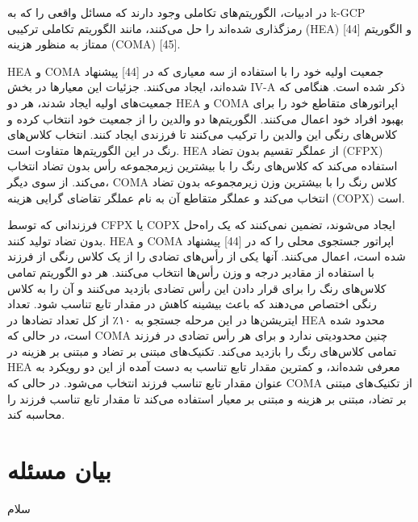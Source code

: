 \documentclass[a4paper,10pt]{article}
\begin{document}
        در ادبیات، الگوریتم‌های تکاملی وجود دارند که مسائل واقعی را که به k-GCP رمزگذاری شده‌اند را حل می‌کنند، مانند الگوریتم تکاملی ترکیبی (HEA) [44] و الگوریتم ممتاز به منظور هزینه (COMA) [45].

        HEA و COMA جمعیت اولیه خود را با استفاده از سه معیاری که در [44] پیشنهاد شده‌اند، ایجاد می‌کنند. جزئیات این معیارها در بخش IV-A ذکر شده است. هنگامی که جمعیت‌های اولیه ایجاد شدند، هر دو HEA و COMA اپراتورهای متقاطع خود را برای بهبود افراد خود اعمال می‌کنند. الگوریتم‌ها دو والدین را از جمعیت خود انتخاب کرده و کلاس‌های رنگی این والدین را ترکیب می‌کنند تا فرزندی ایجاد کنند. انتخاب کلاس‌های رنگ در این الگوریتم‌ها متفاوت است. HEA از عملگر تقسیم بدون تضاد (CFPX) استفاده می‌کند که کلاس‌های رنگ را با بیشترین زیرمجموعه رأس بدون تضاد انتخاب می‌کند. از سوی دیگر، COMA کلاس رنگ را با بیشترین وزن زیرمجموعه بدون تضاد انتخاب می‌کند و عملگر متقاطع آن به نام عملگر تقاضای گرایی هزینه (COPX) است.

        فرزندانی که توسط CFPX یا COPX ایجاد می‌شوند، تضمین نمی‌کنند که یک راه‌حل بدون تضاد تولید کنند. HEA و COMA اپراتور جستجوی محلی را که در [44] پیشنهاد شده است، اعمال می‌کنند. آنها یکی از رأس‌های تضادی را از یک کلاس رنگی از فرزند با استفاده از مقادیر درجه و وزن رأس‌ها انتخاب می‌کنند. هر دو الگوریتم تمامی کلاس‌های رنگ را برای قرار دادن این رأس تضادی بازدید می‌کنند و آن را به کلاس رنگی اختصاص می‌دهند که باعث بیشینه کاهش در مقدار تابع تناسب شود. تعداد ایتریشن‌ها در این مرحله جستجو به ۱۰٪ از کل تعداد تضادها در HEA محدود شده است، در حالی که COMA چنین محدودیتی ندارد و برای هر رأس تضادی در فرزند تمامی کلاس‌های رنگ را بازدید می‌کند. تکنیک‌های مبتنی بر تضاد و مبتنی بر هزینه در HEA معرفی شده‌اند، و کمترین مقدار تابع تناسب به دست آمده از این دو رویکرد به عنوان مقدار تابع تناسب فرزند انتخاب می‌شود. در حالی که COMA از تکنیک‌های مبتنی بر تضاد، مبتنی بر هزینه و مبتنی بر معیار استفاده می‌کند تا مقدار تابع تناسب فرزند را محاسبه کند.

    \section{بیان مسئله}

        سلام
\end{document}
